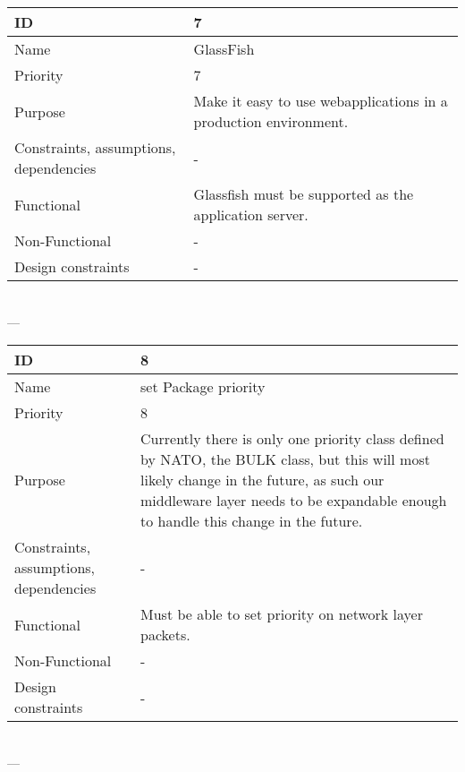 \begin{center}
    \begin{tabular}{| p{4cm} | p{8cm} |}
        \hline
        ID & 7 \\
        \hline
        Name & GlassFish \\
        \hline
        Priority & 7 \\
        \hline
        Purpose & Make it easy to use webapplications in a production environment. \\
        \hline 
        Constraints, assumptions, dependencies & - \\
        \hline  
        Functional & Glassfish must be supported as the application server.  \\
        \hline
        Non-Functional & - \\ 
        \hline
        Design constraints & - \\
        \hline
    \end{tabular}
    \\  ---  \\
    
    \begin{tabular}{| p{4cm} | p{8cm} |}
        \hline
        ID & 8 \\
        \hline
        Name & set Package priority \\
        \hline
        Priority & 8 \\
        \hline
        Purpose & Currently there is only one priority class defined by NATO, the BULK class, but this will most likely change in the future, as such our middleware layer needs to be expandable enough to handle this change in the future. \\
        \hline 
        Constraints, assumptions, dependencies & -\\
        \hline  
        Functional & Must be able to set priority on network layer packets.\\
        \hline
        Non-Functional & -\\ 
        \hline
        Design constraints & - \\
        \hline
    \end{tabular}
    \\  ---  \\
    

\end{center}

